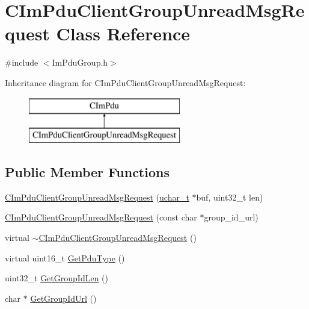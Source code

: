 \hypertarget{class_c_im_pdu_client_group_unread_msg_request}{}\section{C\+Im\+Pdu\+Client\+Group\+Unread\+Msg\+Request Class Reference}
\label{class_c_im_pdu_client_group_unread_msg_request}


{\ttfamily \#include $<$Im\+Pdu\+Group.\+h$>$}

Inheritance diagram for C\+Im\+Pdu\+Client\+Group\+Unread\+Msg\+Request\+:\begin{figure}[H]
\begin{center}
\leavevmode
\includegraphics[height=2.000000cm]{class_c_im_pdu_client_group_unread_msg_request}
\end{center}
\end{figure}
\subsection*{Public Member Functions}
\begin{DoxyCompactItemize}
\item 
\hyperlink{class_c_im_pdu_client_group_unread_msg_request_affb521233fdc348e021ceec329af0943}{C\+Im\+Pdu\+Client\+Group\+Unread\+Msg\+Request} (\hyperlink{base_2ostype_8h_a124ea0f8f4a23a0a286b5582137f0b8d}{uchar\+\_\+t} $\ast$buf, uint32\+\_\+t len)
\item 
\hyperlink{class_c_im_pdu_client_group_unread_msg_request_a8b570d0d117aa6ac45ed634dc93bacf8}{C\+Im\+Pdu\+Client\+Group\+Unread\+Msg\+Request} (const char $\ast$group\+\_\+id\+\_\+url)
\item 
virtual \hyperlink{class_c_im_pdu_client_group_unread_msg_request_ad9726b9ed1253efaeefdb1a0ff4bbae5}{$\sim$\+C\+Im\+Pdu\+Client\+Group\+Unread\+Msg\+Request} ()
\item 
virtual uint16\+\_\+t \hyperlink{class_c_im_pdu_client_group_unread_msg_request_a6b077b8456efc3d9efc2400fda007ad8}{Get\+Pdu\+Type} ()
\item 
uint32\+\_\+t \hyperlink{class_c_im_pdu_client_group_unread_msg_request_a66267889e5451a04c3761fbf748e982b}{Get\+Group\+Id\+Len} ()
\item 
char $\ast$ \hyperlink{class_c_im_pdu_client_group_unread_msg_request_ad7f54997b89abb6fc0af02379f835aa5}{Get\+Group\+Id\+Url} ()
\end{DoxyCompactItemize}
